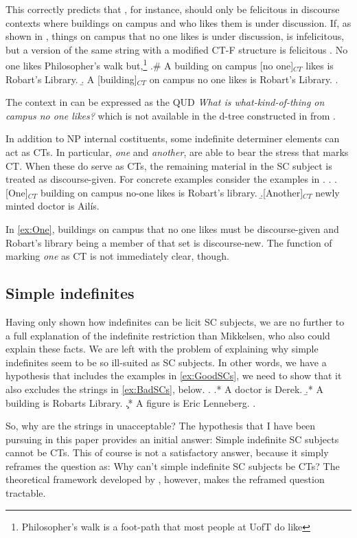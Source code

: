 \documentclass[GPFinal]{subfiles}
\begin{document}
This correctly predicts that \LLast[b], for instance, should only be felicitous in discourse contexts where buildings on campus and who likes them is under discussion.
If, as shown in \Next, things on campus that no one likes is under discussion, \LLast[b] is infelicitous, but a version of the same string with a modified CT-F structure is felicitous
\ex. No one likes Philosopher's walk but,\footnote{Philosopher's walk is a foot-path that most people at UofT do like}
\a.\# A building on campus [no one]$_{CT}$ likes is Robart's Library.
\b. A [building]$_{CT}$ on campus no one likes is Robart's Library.
\z.

The context in \Last can be expressed as the QUD \textit{What is what-kind-of-thing on campus no one likes?} which is not available in the d-tree constructed in \LLast from \Last[a].

In addition to NP internal costituents, some indefinite determiner elements can act as CTs.
In particular, \textit{one} and \textit{another}, are able to bear the stress that marks CT.
When these do serve as CTs, the remaining material in the SC subject is treated as discourse-given.
For concrete examples consider the examples in \Next.
\ex.
\a.\label{ex:One} [One]$_{CT}$ building on campus no-one likes is Robart's library.
\b.\label{ex:Another}[Another]$_{CT}$ newly minted doctor is Ail\'is.

In \ref{ex:One}, buildings on campus that no one likes must be discourse-given and Robart's library being a member of that set is discourse-new.
The function of marking \textit{one} as CT is not immediately clear, though.



\subsection{Simple indefinites}
Having only shown how indefinites can be licit SC subjects, we are no further to a full explanation of the indefinite restriction than Mikkelsen, who also could explain these facts.
We are left with the problem of explaining why simple indefinites seem to be so ill-suited as SC subjects.
In other words, we have a hypothesis that includes the examples in \ref{ex:GoodSCs}, we need to show that it also excludes the strings in \ref{ex:BadSCs}, below.
\ex.\label{ex:BadSCs}
\a.* A doctor is Derek.
\b.* A building is Robarts Library.
\c.* A figure is Eric Lenneberg.
\z.

So, why are the strings in \Last unacceptable?
The hypothesis that I have been pursuing in this paper provides an initial answer: Simple indefinite SC subjects cannot be CTs.
This of course is not a satisfactory answer, because it simply reframes the question as: Why can't simple indefinite SC subjects be CTs?
The theoretical framework developed by \textcite{rooth1992theory,roberts2012information,buring2003d,buringforthcomingtopic}, however, makes the reframed question tractable.
\end{document}
